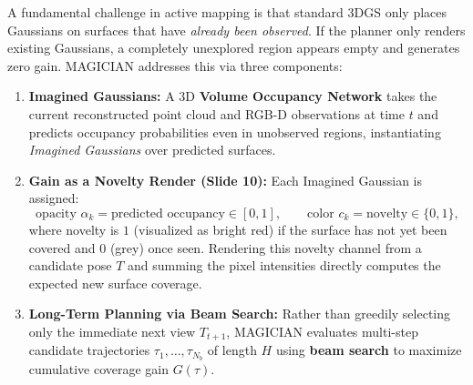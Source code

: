 \documentclass[11pt, a4paper]{article}
\theoremstyle{definition}
\begin{document}
A fundamental challenge in active mapping is that standard 3DGS only places Gaussians on surfaces that have \emph{already been observed}. If the planner only renders existing Gaussians, a completely unexplored region appears empty and generates zero gain. MAGICIAN addresses this via three components:
\begin{enumerate}[leftmargin=*]
    \item \textbf{Imagined Gaussians:} A 3D \textbf{Volume Occupancy Network} takes the current reconstructed point cloud and RGB-D observations at time $t$ and predicts occupancy probabilities even in unobserved regions, instantiating \emph{Imagined Gaussians} over predicted surfaces.
    \item \textbf{Gain as a Novelty Render (Slide 10):} Each Imagined Gaussian is assigned:
    \[
    \text{opacity } \alpha_k = \text{predicted occupancy} \in [0,1], \qquad \text{color } c_k = \text{novelty} \in \{0, 1\},
    \]
    where novelty is $1$ (visualized as bright red) if the surface has not yet been covered and $0$ (grey) once seen. Rendering this novelty channel from a candidate pose $T$ and summing the pixel intensities directly computes the expected new surface coverage.
    \item \textbf{Long-Term Planning via Beam Search:} Rather than greedily selecting only the immediate next view $T_{t+1}$, MAGICIAN evaluates multi-step candidate trajectories $\tau_1, \dots, \tau_{N_b}$ of length $H$ using \textbf{beam search} to maximize cumulative coverage gain $G(\tau)$.
\end{enumerate}
\end{document}
